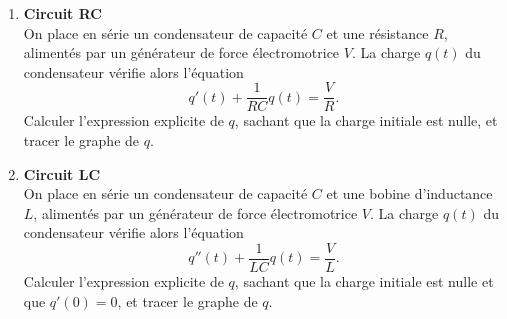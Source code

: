 \documentclass[a4paper, 11pt,reqno]{article}
\begin{document}



\begin{exercice}  \;
  \begin{enumerate}
    \item \textbf{Circuit RC}\\
          On place en s\'erie un condensateur de capacit\'e $C$ et une r\'esistance $R$, aliment\'es par un g\'en\'erateur de force \'electromotrice $V$. La charge $q(t)$ du condensateur v\'erifie alors l'\'equation
          $$q'(t) + \frac{1}{RC} q(t) = \frac{V}{R}.$$
          Calculer l'expression explicite de $q$, sachant que la charge initiale est nulle, et tracer le graphe de $q$.
    \item \textbf{Circuit LC}\\
          On place en s\'erie un condensateur de capacit\'e $C$ et une bobine d'inductance $L$, aliment\'es par un g\'en\'erateur de force \'electromotrice $V$. La charge $q(t)$ du condensateur v\'erifie alors l'\'equation
          $$q''(t) + \frac{1}{LC} q(t) = \frac{V}{L}.$$
          Calculer l'expression explicite de $q$, sachant que la charge initiale est nulle et que $q'(0)=0$, et tracer le graphe de $q$.
  \end{enumerate}
\end{exercice}
\end{document}
